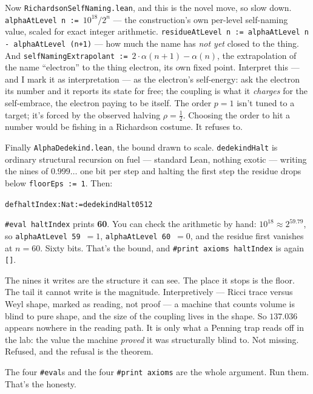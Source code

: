 Now \texttt{RichardsonSelfNaming.lean}, and this is the novel move, so slow down.
\texttt{alphaAtLevel n :=}~\(10^{18}/2^{n}\) --- the construction's own per-level self-naming value, scaled for
exact integer arithmetic. \texttt{residueAtLevel n := alphaAtLevel n - alphaAtLevel (n+1)} --- how much the name has
\emph{not yet} closed to the thing. And \texttt{selfNamingExtrapolant :=}~\(2\cdot\alpha(n{+}1) - \alpha(n)\), the
extrapolation of the name ``electron'' to the thing electron, its own fixed point. Interpret this --- and I mark it
as interpretation --- as the electron's self-energy: ask the electron its number and it reports its state for free;
the coupling is what it \emph{charges} for the self-embrace, the electron paying to be itself. The order \(p=1\)
isn't tuned to a target; it's forced by the observed halving \(\rho=\tfrac{1}{2}\). Choosing the order to hit a
number would be fishing in a Richardson costume. It refuses to.

Finally \texttt{AlphaDedekind.lean}, the bound drawn to scale. \texttt{dedekindHalt} is ordinary structural
recursion on fuel --- standard Lean, nothing exotic --- writing the nines of \(0.999\ldots\) one bit per step and
halting the first step the residue drops below \texttt{floorEps := 1}. Then:

\begin{alltt}
def haltIndex : Nat := dedekindHalt 0 512
\end{alltt}

\texttt{\#eval haltIndex} prints \textbf{60}. You can check the arithmetic by hand: \(10^{18} \approx 2^{59.79}\), so
\texttt{alphaAtLevel 59}~\(= 1\), \texttt{alphaAtLevel 60}~\(= 0\), and the residue first vanishes at \(n = 60\).
Sixty bits. That's the bound, and \texttt{\#print axioms haltIndex} is again \texttt{[]}.

The nines it writes are the structure it can see. The place it stops is the floor. The tail it cannot write is the
magnitude. Interpretively --- Ricci trace versus Weyl shape, marked as reading, not proof --- a machine that counts
volume is blind to pure shape, and the size of the coupling lives in the shape. So \(137.036\) appears nowhere in the
reading path. It is only what a Penning trap reads off in the lab: the value the machine \emph{proved} it was
structurally blind to. Not missing. Refused, and the refusal is the theorem.

The four \texttt{\#eval}s and the four \texttt{\#print axioms} are the whole argument. Run them. That's the honesty.
